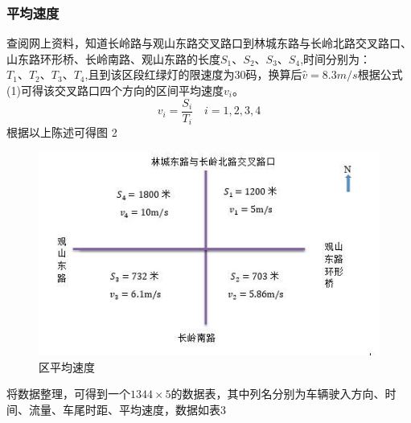 \documentclass[UTF8]{article}
\begin{document}
    \subsubsection{平均速度}
    查阅网上资料，知道长岭路与观山东路交叉路口到林城东路与长岭北路交叉路口、山东路环形桥、长岭南路、观山东路的长度$S_1、S_2、S_3、S_4$,时间分别为：$T_1、T_2、T_3、T_4$,且到该区段红绿灯的限速度为30码，换算后$ v ̂=8.3m/s$根据公式(1)可得该交叉路口四个方向的区间平均速度$v_i$。
        \begin{equation}
            v_i=\frac{S_i}{T_i}     \quad           i=1,2,3,4	
        \end{equation}	
        根据以上陈述可得图 2\\
    \begin{figure}[H]
        \includegraphics[width= \linewidth]{2.jpg}
        \caption{区平均速度}
    \end{figure}
    将数据整理，可得到一个$1344×5$的数据表，其中列名分别为车辆驶入方向、时间、流量、车尾时距、平均速度，数据如表3\\
\end{document}
